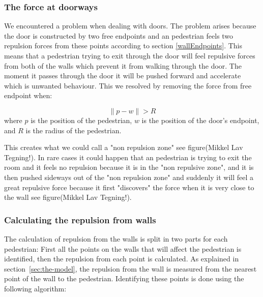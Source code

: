 \subsubsection{The force at doorways}
We encountered a problem when dealing with doors. The problem arises because 
the door is constructed by two free endpoints and an pedestrian feels two repulsion 
forces from these points according to section \ref{wallEndpoints}. This means 
that a pedestrian trying to exit through the door will feel repulsive forces 
from both of the walls which prevent it from walking through the door. The moment it 
passes through the door it will be pushed forward and accelerate which is unwanted 
behaviour. This we resolved by removing the force from free endpoint when:

\begin{equation}
\| p - w \| > R
\end{equation}
where $ p $ is the position of the pedestrian, $ w $ is the position of the door's endpoint, 
and $ R $ is the radius of the pedestrian.

This creates what we could call a "non repulsion zone" see figure(Mikkel Lav Tegning!).
In rare cases it could happen that an pedestrian is trying to exit the room and it feels 
no repulsion because it is in the "non repulsive zone", and it is then pushed sideways out 
of the "non repulsion zone" and suddenly it will feel a great repulsive force because 
it first "discovers" the force when it is very close to the wall see figure(Mikkel Lav Tegning!).

\subsubsection{Calculating the repulsion from walls}
\label{sec:repulsion-points}
The calculation of repulsion from the walls is split in two parts for each 
pedestrian: First all the points on the walls that will affect the pedestrian is 
identified, then the repulsion from each point is calculated. As explained in 
section~\ref{sec:the-model}, the repulsion from the wall is measured from the 
nearest point of the wall to the pedestrian. Identifying these points is done using 
the following algorithm:

